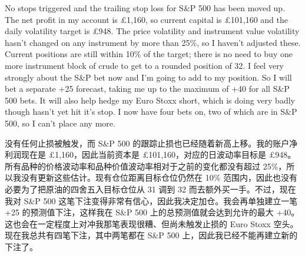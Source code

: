 \begin{englishblock} No stops triggered and the trailing stop loss for S\&P 500 has been moved up. The net profit in my account is £1,160, so current capital is £101,160 and the daily volatility target is £948. The price volatility and instrument value volatility hasn't changed on any instrument by more than 25\%, so I haven't adjusted these. Current positions are still within 10\% of the target; there is no need to buy one more instrument block of crude to get to a rounded position of 32. I feel very strongly about the S\&P bet now and I'm going to add to my position. So I will bet a separate +25 forecast, taking me up to the maximum of +40 for all S\&P 500 bets. It will also help hedge my Euro Stoxx short, which is doing very badly though hasn't yet hit it's stop. I now have four bets on, two of which are in S\&P 500, so I can't place any more. \end{englishblock}

\begin{chineseblock}没有任何止损被触发，而 S\&P 500 的跟踪止损也已经随着新高上移。我的账户净利润现在是 £1,160，因此当前资本是 £101,160，对应的日波动率目标是 £948。所有品种的价格波动率和品种价值波动率相对于之前的变化都没有超过 25\%，所以我没有更新这些估计。现有仓位距离目标仓位仍然在 10\% 范围内，因此也没有必要为了把原油的四舍五入目标仓位从 31 调到 32 而去额外买一手。不过，现在我对 S\&P 500 这笔下注变得非常有信心，因此我决定加仓。我会再单独建立一笔 +25 的预测值下注，这样我在 S\&P 500 上的总预测值就会达到允许的最大 +40。这也会在一定程度上对冲我那笔表现很糟、但尚未触发止损的 Euro Stoxx 空头。现在我总共有四笔下注，其中两笔都在 S\&P 500 上，因此我已经不能再建立新的下注了。\end{chineseblock}

